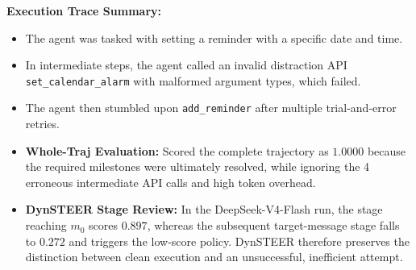\textbf{Execution Trace Summary:}
\begin{itemize}[leftmargin=*,itemsep=1pt]
    \item The agent was tasked with setting a reminder with a specific date and time.
    \item In intermediate steps, the agent called an invalid distraction API \texttt{set\_calendar\_alarm} with malformed argument types, which failed.
    \item The agent then stumbled upon \texttt{add\_reminder} after multiple trial-and-error retries.
    \item \textbf{Whole-Traj Evaluation:} Scored the complete trajectory as $1.0000$ because the required milestones were ultimately resolved, while ignoring the 4 erroneous intermediate API calls and high token overhead.
    \item \textbf{DynSTEER Stage Review:} In the DeepSeek-V4-Flash run, the stage reaching $m_0$ scores $0.897$, whereas the subsequent target-message stage falls to $0.272$ and triggers the low-score policy. DynSTEER therefore preserves the distinction between clean execution and an unsuccessful, inefficient attempt.
\end{itemize}
